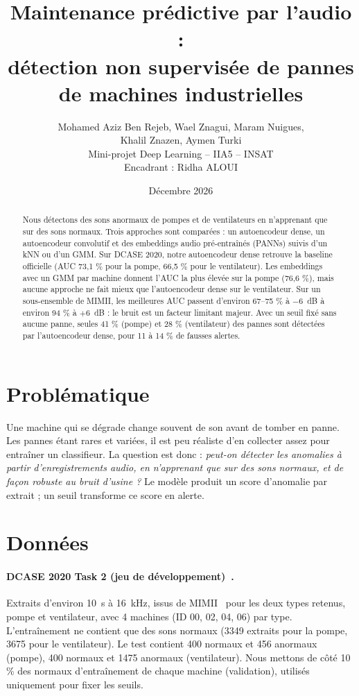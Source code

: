 \documentclass[11pt,a4paper]{article}
\title{Maintenance prédictive par l'audio :\\ détection non supervisée de pannes de machines industrielles}
\author{Mohamed Aziz Ben Rejeb, Wael Znagui, Maram Nuigues,\\ Khalil Znazen, Aymen Turki\\[2pt] Mini-projet Deep Learning -- IIA5 -- INSAT\\ Encadrant : Ridha ALOUI}
\date{Décembre 2026}
\begin{document}
\maketitle

\begin{abstract}
Nous détectons des sons anormaux de pompes et de ventilateurs en n'apprenant que sur des sons normaux.
Trois approches sont comparées : un autoencodeur dense, un autoencodeur convolutif et des embeddings audio
pré-entraînés (PANNs) suivis d'un kNN ou d'un GMM. Sur DCASE 2020, notre autoencodeur dense retrouve la
baseline officielle (AUC 73,1 \% pour la pompe, 66,5 \% pour le ventilateur). Les embeddings avec un GMM par
machine donnent l'AUC la plus élevée sur la pompe (76,6 \%), mais aucune approche ne fait mieux que
l'autoencodeur dense sur le ventilateur. Sur un sous-ensemble de MIMII, les meilleures AUC passent d'environ
67--75 \% à $-6$~dB à environ 94 \% à $+6$~dB : le bruit est un facteur limitant majeur. Avec un seuil fixé sans aucune panne,
seules 41 \% (pompe) et 28 \% (ventilateur) des pannes sont détectées par l'autoencodeur dense, pour 11 à 14 \% de fausses alertes.
\end{abstract}

\section{Problématique}
Une machine qui se dégrade change souvent de son avant de tomber en panne. Les pannes étant rares et variées,
il est peu réaliste d'en collecter assez pour entraîner un classifieur. La question est donc : \emph{peut-on détecter
les anomalies à partir d'enregistrements audio, en n'apprenant que sur des sons normaux, et de façon robuste au bruit
d'usine ?} Le modèle produit un score d'anomalie par extrait ; un seuil transforme ce score en alerte.

\section{Données}
\paragraph{DCASE 2020 Task 2 (jeu de développement)~\cite{zenodo,koizumi}.} Extraits d'environ 10~s à 16~kHz, issus de
MIMII~\cite{purohit} pour les deux types retenus, pompe et ventilateur, avec 4 machines (ID 00, 02, 04, 06) par type.
L'entraînement ne contient que des sons normaux (3349 extraits pour la pompe, 3675 pour le ventilateur). Le test contient
400 normaux et 456 anormaux (pompe), 400 normaux et 1475 anormaux (ventilateur). Nous mettons de côté 10 \%
des normaux d'entraînement de chaque machine (validation), utilisés uniquement pour fixer les seuils.
\end{document}
